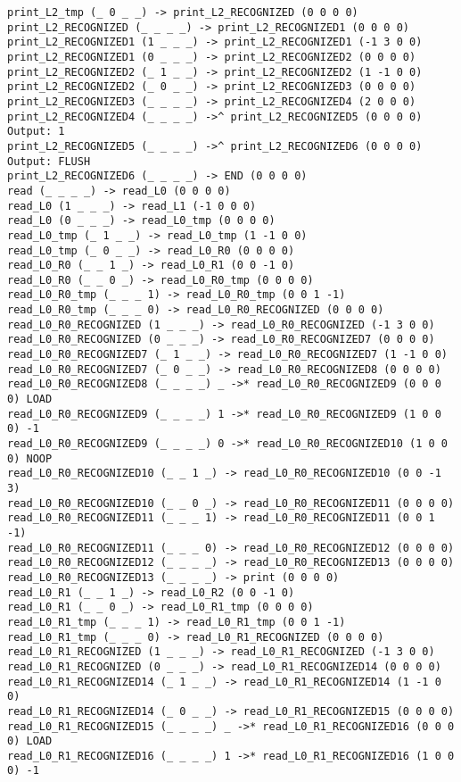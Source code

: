 \documentclass[english,shortabstract,mgr]{iithesis}
\begin{document}
\begin{verbatim}
print_L2_tmp (_ 0 _ _) -> print_L2_RECOGNIZED (0 0 0 0)
print_L2_RECOGNIZED (_ _ _ _) -> print_L2_RECOGNIZED1 (0 0 0 0)
print_L2_RECOGNIZED1 (1 _ _ _) -> print_L2_RECOGNIZED1 (-1 3 0 0)
print_L2_RECOGNIZED1 (0 _ _ _) -> print_L2_RECOGNIZED2 (0 0 0 0)
print_L2_RECOGNIZED2 (_ 1 _ _) -> print_L2_RECOGNIZED2 (1 -1 0 0)
print_L2_RECOGNIZED2 (_ 0 _ _) -> print_L2_RECOGNIZED3 (0 0 0 0)
print_L2_RECOGNIZED3 (_ _ _ _) -> print_L2_RECOGNIZED4 (2 0 0 0)
print_L2_RECOGNIZED4 (_ _ _ _) ->^ print_L2_RECOGNIZED5 (0 0 0 0) Output: 1
print_L2_RECOGNIZED5 (_ _ _ _) ->^ print_L2_RECOGNIZED6 (0 0 0 0) Output: FLUSH
print_L2_RECOGNIZED6 (_ _ _ _) -> END (0 0 0 0)
read (_ _ _ _) -> read_L0 (0 0 0 0)
read_L0 (1 _ _ _) -> read_L1 (-1 0 0 0)
read_L0 (0 _ _ _) -> read_L0_tmp (0 0 0 0)
read_L0_tmp (_ 1 _ _) -> read_L0_tmp (1 -1 0 0)
read_L0_tmp (_ 0 _ _) -> read_L0_R0 (0 0 0 0)
read_L0_R0 (_ _ 1 _) -> read_L0_R1 (0 0 -1 0)
read_L0_R0 (_ _ 0 _) -> read_L0_R0_tmp (0 0 0 0)
read_L0_R0_tmp (_ _ _ 1) -> read_L0_R0_tmp (0 0 1 -1)
read_L0_R0_tmp (_ _ _ 0) -> read_L0_R0_RECOGNIZED (0 0 0 0)
read_L0_R0_RECOGNIZED (1 _ _ _) -> read_L0_R0_RECOGNIZED (-1 3 0 0)
read_L0_R0_RECOGNIZED (0 _ _ _) -> read_L0_R0_RECOGNIZED7 (0 0 0 0)
read_L0_R0_RECOGNIZED7 (_ 1 _ _) -> read_L0_R0_RECOGNIZED7 (1 -1 0 0)
read_L0_R0_RECOGNIZED7 (_ 0 _ _) -> read_L0_R0_RECOGNIZED8 (0 0 0 0)
read_L0_R0_RECOGNIZED8 (_ _ _ _) _ ->* read_L0_R0_RECOGNIZED9 (0 0 0 0) LOAD
read_L0_R0_RECOGNIZED9 (_ _ _ _) 1 ->* read_L0_R0_RECOGNIZED9 (1 0 0 0) -1
read_L0_R0_RECOGNIZED9 (_ _ _ _) 0 ->* read_L0_R0_RECOGNIZED10 (1 0 0 0) NOOP
read_L0_R0_RECOGNIZED10 (_ _ 1 _) -> read_L0_R0_RECOGNIZED10 (0 0 -1 3)
read_L0_R0_RECOGNIZED10 (_ _ 0 _) -> read_L0_R0_RECOGNIZED11 (0 0 0 0)
read_L0_R0_RECOGNIZED11 (_ _ _ 1) -> read_L0_R0_RECOGNIZED11 (0 0 1 -1)
read_L0_R0_RECOGNIZED11 (_ _ _ 0) -> read_L0_R0_RECOGNIZED12 (0 0 0 0)
read_L0_R0_RECOGNIZED12 (_ _ _ _) -> read_L0_R0_RECOGNIZED13 (0 0 0 0)
read_L0_R0_RECOGNIZED13 (_ _ _ _) -> print (0 0 0 0)
read_L0_R1 (_ _ 1 _) -> read_L0_R2 (0 0 -1 0)
read_L0_R1 (_ _ 0 _) -> read_L0_R1_tmp (0 0 0 0)
read_L0_R1_tmp (_ _ _ 1) -> read_L0_R1_tmp (0 0 1 -1)
read_L0_R1_tmp (_ _ _ 0) -> read_L0_R1_RECOGNIZED (0 0 0 0)
read_L0_R1_RECOGNIZED (1 _ _ _) -> read_L0_R1_RECOGNIZED (-1 3 0 0)
read_L0_R1_RECOGNIZED (0 _ _ _) -> read_L0_R1_RECOGNIZED14 (0 0 0 0)
read_L0_R1_RECOGNIZED14 (_ 1 _ _) -> read_L0_R1_RECOGNIZED14 (1 -1 0 0)
read_L0_R1_RECOGNIZED14 (_ 0 _ _) -> read_L0_R1_RECOGNIZED15 (0 0 0 0)
read_L0_R1_RECOGNIZED15 (_ _ _ _) _ ->* read_L0_R1_RECOGNIZED16 (0 0 0 0) LOAD
read_L0_R1_RECOGNIZED16 (_ _ _ _) 1 ->* read_L0_R1_RECOGNIZED16 (1 0 0 0) -1

\end{verbatim}
\end{document}
